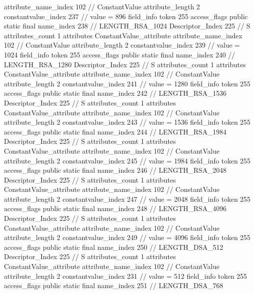 {{{{{{{					attribute_name_index	102		// ConstantValue
					attribute_length	2
					constantvalue_index	237		// value = 896
				}
				}
			}
			field_info {
				token	255
				access_flags	public static final
				name_index	238		// LENGTH_RSA_1024
				Descriptor_Index	225		// S
				attributes_count	1
				attributes {
				ConstantValue_attribute {
					attribute_name_index	102		// ConstantValue
					attribute_length	2
					constantvalue_index	239		// value = 1024
				}
				}
			}
			field_info {
				token	255
				access_flags	public static final
				name_index	240		// LENGTH_RSA_1280
				Descriptor_Index	225		// S
				attributes_count	1
				attributes {
				ConstantValue_attribute {
					attribute_name_index	102		// ConstantValue
					attribute_length	2
					constantvalue_index	241		// value = 1280
				}
				}
			}
			field_info {
				token	255
				access_flags	public static final
				name_index	242		// LENGTH_RSA_1536
				Descriptor_Index	225		// S
				attributes_count	1
				attributes {
				ConstantValue_attribute {
					attribute_name_index	102		// ConstantValue
					attribute_length	2
					constantvalue_index	243		// value = 1536
				}
				}
			}
			field_info {
				token	255
				access_flags	public static final
				name_index	244		// LENGTH_RSA_1984
				Descriptor_Index	225		// S
				attributes_count	1
				attributes {
				ConstantValue_attribute {
					attribute_name_index	102		// ConstantValue
					attribute_length	2
					constantvalue_index	245		// value = 1984
				}
				}
			}
			field_info {
				token	255
				access_flags	public static final
				name_index	246		// LENGTH_RSA_2048
				Descriptor_Index	225		// S
				attributes_count	1
				attributes {
				ConstantValue_attribute {
					attribute_name_index	102		// ConstantValue
					attribute_length	2
					constantvalue_index	247		// value = 2048
				}
				}
			}
			field_info {
				token	255
				access_flags	public static final
				name_index	248		// LENGTH_RSA_4096
				Descriptor_Index	225		// S
				attributes_count	1
				attributes {
				ConstantValue_attribute {
					attribute_name_index	102		// ConstantValue
					attribute_length	2
					constantvalue_index	249		// value = 4096
				}
				}
			}
			field_info {
				token	255
				access_flags	public static final
				name_index	250		// LENGTH_DSA_512
				Descriptor_Index	225		// S
				attributes_count	1
				attributes {
				ConstantValue_attribute {
					attribute_name_index	102		// ConstantValue
					attribute_length	2
					constantvalue_index	231		// value = 512
				}
				}
			}
			field_info {
				token	255
				access_flags	public static final
				name_index	251		// LENGTH_DSA_768
}}}}}
